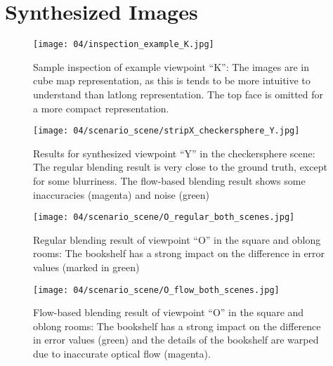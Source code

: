 \chapter{Synthesized Images}\label{imgs}

\begin{figure}
		\centering
		\texttt{[image: 04/inspection\_example\_K.jpg]}
		\caption{Sample inspection of example viewpoint ``K'': The images are in cube map representation, as this is tends to be more intuitive to understand than latlong representation. The top face is omitted for a more compact representation.}
		\label{fig:inspection_example}
\end{figure}

\begin{figure}
		\centering
    \texttt{[image: 04/scenario\_scene/stripX\_checkersphere\_Y.jpg]}
		\caption{Results for synthesized viewpoint ``Y'' in the checkersphere scene: The regular blending result is very close to the ground truth, except for some blurriness. The flow-based blending result shows some inaccuracies (magenta) and noise (green)}
		\label{fig:scene_checkersphere_Y}
\end{figure}

\begin{figure}
		\centering
    \texttt{[image: 04/scenario\_scene/O\_regular\_both\_scenes.jpg]}
		\caption{Regular blending result of viewpoint ``O'' in the square and oblong rooms: The bookshelf has a strong impact on the difference in error values (marked in green)}
		\label{fig:scene_O_regular}
\end{figure}

\begin{figure}
		\centering
    \texttt{[image: 04/scenario\_scene/O\_flow\_both\_scenes.jpg]}
		\caption{Flow-based blending result of viewpoint ``O'' in the square and oblong rooms: The bookshelf has a strong impact on the difference in error values (green) and the details of the bookshelf are warped due to inaccurate optical flow (magenta).}
		\label{fig:scene_O_flow}
\end{figure}

%

